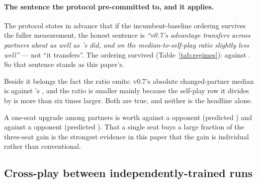 \begin{table}[t]\centering
\caption{The same table against a \vsix{} opponent.}
\label{tab:partnerssix}
{\small}
\end{table}

\paragraph{The sentence the protocol pre-committed to, and it applies.}
The protocol states in advance that if the incumbent-baseline ordering survives the fuller
measurement, the honest sentence is \emph{``v0.7's advantage transfers across partners about as well
as \vsix{}'s did, and on the median-to-self-play ratio slightly less well''} --- not ``it transfers''.
The ordering survived (Table~\ref{tab:regimes}): \vsevenSoneRatio{} against
\vsevenBaseRatio{}. So that sentence stands as this paper's.

\begin{table}[t]\centering
\caption{Transfer across partners, v0.7 over \vsix{} against \vsix{} over \vfive{}. The two holdout
rows are the same eight settings on the same two banks and are generated from the artifacts. The two
training rows are quoted from the protocol, which states them in advance; they are on training banks,
and the protocol records that its \vsix{}-over-\vfive{} training row is computed on three of the seven
changed settings only, so that row is not like-for-like with the holdout one above it. Reported and
\emph{not} gated, as the protocol requires.}
\label{tab:regimes}
{\small}
\end{table}

Beside it belongs the fact the ratio omits: v0.7's absolute changed-partner median is
\vsevenSoneMedian{} against \vsix{}'s \vsevenBaseMedian{}, and the ratio is smaller mainly because the
self-play row it divides by is more than six times larger. Both are true, and neither is the headline
alone.

A one-seat upgrade among \vsix{} partners is worth \vsevenOneSeatFive{} against a \vfive{} opponent
(predicted \vsevenTrainOneSeatFive{}) and \vsevenOneSeatSix{} against a \vsix{} opponent (predicted
\vsevenTrainOneSeatSix{}). That a single seat buys a large fraction of the three-seat gain is the
strongest evidence in this paper that the gain is individual rather than conventional.

\subsection{Cross-play between independently-trained runs}
\label{sec:results-crossplay}

